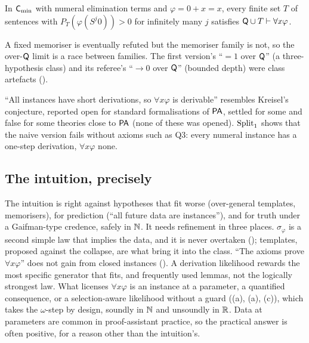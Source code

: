 \begin{lemma}\label{lem:univ:survivors}
In $\mathsf{C}_{\min}$ with numeral elimination terms and $\varphi=0+x=x$, every finite set $T$ of sentences with $P_T(\varphi(S^j0))>0$ for infinitely many $j$ satisfies $\mathsf{Q}\cup T\vdash\forall x\varphi$.
\end{lemma}

\noindent A fixed memoriser is eventually refuted but the memoriser family is not, so the over-$\mathsf{Q}$ limit is a race between families. The first version's ``$=1$ over $\mathsf{Q}$'' (a three-hypothesis class) and its referee's ``$\to0$ over $\mathsf{Q}$'' (bounded depth) were class artefacts ().

\begin{remark}\label{rem:univ:kreisel}
``All instances have short derivations, so $\forall x\varphi$ is derivable'' resembles Kreisel's conjecture, reported open for standard formalisations of $\mathsf{PA}$, settled for some \citep{parikh1973some,baaz1993kreisel} and false for some theories close to $\mathsf{PA}$ \citep{hrubes2007theories} (none of these was opened). $\mathrm{Split}_1$ shows that the naive version fails without axioms such as Q3: every numeral instance has a one-step derivation, $\forall x\varphi$ none.
\end{remark}

\subsection{The intuition, precisely}\label{sec:univ:intuition}

The intuition is right against hypotheses that fit worse (over-general templates, memorisers), for prediction (``all future data are instances''), and for truth under a Gaifman-type credence, safely in $\mathbb{N}$. It needs refinement in three places. $\sigma_\varphi$ is a second simple law that implies the data, and it is never overtaken (); templates, proposed against the collapse, are what bring it into the class. ``The axioms prove $\forall x\varphi$'' does not gain from closed instances (). A derivation likelihood rewards the most specific generator that fits, and frequently used lemmas, not the logically strongest law. What licenses $\forall x\varphi$ is an instance at a parameter, a quantified consequence, or a selection-aware likelihood without a guard ((a), (a), (c)), which takes the $\omega$-step by design, soundly in $\mathbb{N}$ and unsoundly in $\mathbb{R}$. Data at parameters are common in proof-assistant practice, so the practical answer is often positive, for a reason other than the intuition's.

